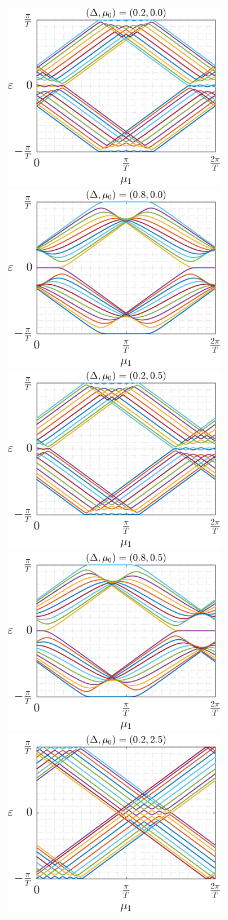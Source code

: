 \documentclass[11pt]{report}
\begin{document}
\begin{figure}
\includegraphics[width=0.5\textwidth]{Figures/Fig3.png}%
\includegraphics[width=0.5\textwidth]{Figures/Fig4.png}\\
\includegraphics[width=0.5\textwidth]{Figures/Fig5.png}%
\includegraphics[width=0.5\textwidth]{Figures/Fig6.png}\\
\includegraphics[width=0.5\textwidth]{Figures/Fig7.png}%

\end{figure}
\end{document}
